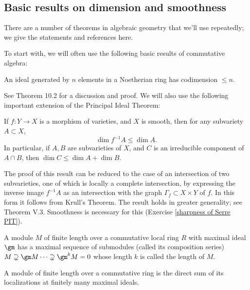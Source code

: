 \subsection{Basic results on dimension and smoothness}

There are a number of theorems in algebraic geometry that we'll use repeatedly; we give the statements and references here.

To start with, we will often use  the following basic results of commutative algebra:

\begin{theorem} \label{Krull}
An ideal generated by $n$ elements in a Noetherian ring has codimension
$\leq n$. 
\end{theorem}


See \cite{Eisenbud1995} Theorem 10.2 for a discussion and proof.
We will also use the following important extension of the Principal Ideal Theorem:

\begin{theorem}\label{Serre}
If  $f:Y\to X$ is a morphism of varieties, and $X$ is smooth, then for any subvariety $A\subset X$, 
$$
\dim f^{-1}A \leq \dim A.
$$
In particular, if $A,B$ are subvarieties of $X$, and $C$ is an irreducible component of $A\cap B$,
 then $\dim C \leq \dim A + \dim B$.
\end{theorem}
The proof of this result can be reduced to the case of an intersection of two subvarieties, one of which is locally a complete intersection, by expressing the inverse image $f^{-1}A$ as an intersection with the graph $\Gamma_f \subset X \times Y$ of $f$. In this form it follows from Krull's 
Theorem. The result holds in greater generality; see %
\cite{MR1771925} Theorem V.3. Smoothness is necessary for this (Exercise \ref{sharpness of Serre PIT}).

\begin{theorem}\label{J-H}
A module $M$ of finite length over a commutative local ring $R$ with maximal ideal $\gm$ 
has a maximal sequence of submodules (called its composition series)
$M\supsetneq \gm M\cdots\supsetneq \gm^{k}M = 0$
whose length $k$ is called the length of $M$.
\end{theorem}

\begin{theorem}\label{chinese}
A module of finite length over a commutative ring is the direct sum of its localizations at 
finitely many maximal
ideals.
\end{theorem}



